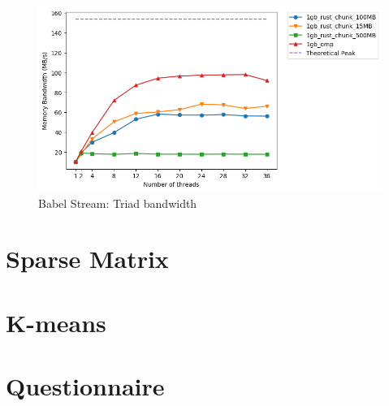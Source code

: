 \begin{figure}[h]\label{fig:babel-Triad}
\centering
\includegraphics[width=\linewidth]{figs/babel/Triad.png}
\caption{Babel Stream: Triad bandwidth}
\end{figure}
\section{Sparse Matrix}\label{sec:res-sparse}
\section{K-means}
\section{Questionnaire}
